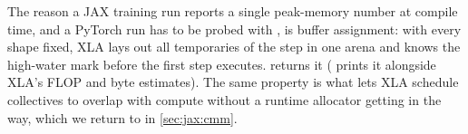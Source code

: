 \begin{systemslens}
The reason a JAX training run reports a single peak-memory number at compile time, and a
PyTorch run has to be probed with , is buffer assignment: with
every shape fixed, XLA lays out all temporaries of the step in one arena and knows the
high-water mark before the first step executes.  returns it
( prints it alongside XLA's FLOP and byte estimates). The same
property is what lets XLA schedule collectives to overlap with compute without a runtime
allocator getting in the way, which we return to in \cref{sec:jax:cmm}.
\end{systemslens}

